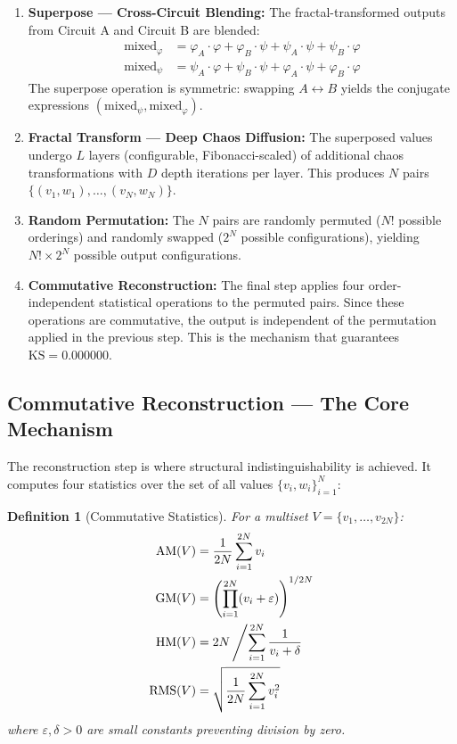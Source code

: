 \documentclass[11pt,a4paper]{article}
\newtheorem{definition}[theorem]{Definition}
\begin{document}
\begin{enumerate}[leftmargin=*,itemsep=4pt]
    \item \textbf{Superpose — Cross-Circuit Blending:} The fractal-transformed outputs from Circuit A and Circuit B are blended:
    \begin{align}
        \text{mixed}_\varphi &= \varphi_A \cdot \varphi + \varphi_B \cdot \psi + \psi_A \cdot \psi + \psi_B \cdot \varphi \label{eq:superpose1} \\
        \text{mixed}_\psi &= \psi_A \cdot \varphi + \psi_B \cdot \psi + \varphi_A \cdot \psi + \varphi_B \cdot \varphi \label{eq:superpose2}
    \end{align}
    The superpose operation is symmetric: swapping $A \leftrightarrow B$ yields the conjugate expressions $(\text{mixed}_\psi, \text{mixed}_\varphi)$.
    
    \item \textbf{Fractal Transform — Deep Chaos Diffusion:} The superposed values undergo $L$ layers (configurable, Fibonacci-scaled) of additional chaos transformations with $D$ depth iterations per layer. This produces $N$ pairs $\{(v_1, w_1), \ldots, (v_N, w_N)\}$.
    
    \item \textbf{Random Permutation:} The $N$ pairs are randomly permuted ($N!$ possible orderings) and randomly swapped ($2^N$ possible configurations), yielding $N! \times 2^N$ possible output configurations.
    
    \item \textbf{Commutative Reconstruction:} The final step applies four order-independent statistical operations to the permuted pairs. Since these operations are commutative, the output is independent of the permutation applied in the previous step. This is the mechanism that guarantees $\text{KS} = 0.000000$.
\end{enumerate}

\subsection{Commutative Reconstruction — The Core Mechanism}

The reconstruction step is where structural indistinguishability is achieved. It computes four statistics over the set of all values $\{v_i, w_i\}_{i=1}^{N}$:

\begin{definition}[Commutative Statistics]
For a multiset $V = \{v_1, \ldots, v_{2N}\}$:
\begin{align}
\text{AM}(V) &= \frac{1}{2N}\sum_{i=1}^{2N} v_i \label{eq:am} \\
\text{GM}(V) &= \left(\prod_{i=1}^{2N} (v_i + \varepsilon)\right)^{1/2N} \label{eq:gm} \\
\text{HM}(V) &= 2N \left/ \sum_{i=1}^{2N} \frac{1}{v_i + \delta} \right. \label{eq:hm} \\
\text{RMS}(V) &= \sqrt{\frac{1}{2N}\sum_{i=1}^{2N} v_i^2} \label{eq:rms}
\end{align}
where $\varepsilon, \delta > 0$ are small constants preventing division by zero.
\end{definition}
\end{document}

